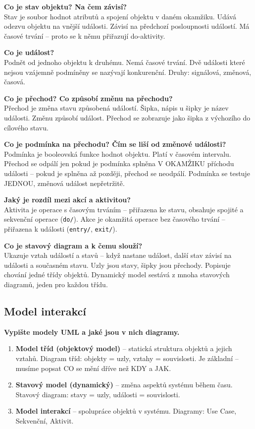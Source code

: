 \documentclass[12pt, a4paper]{article}
\begin{document}
\textbf{Co je stav objektu? Na čem závisí?}\\
Stav je soubor hodnot atributů a spojení objektu v daném okamžiku. Udává odezvu objektu na vnější události. Závisí na předchozí posloupnosti událostí. Má časové trvání -- proto se k němu přiřazují do-aktivity.

\textbf{Co je událost?}\\
Podnět od jednoho objektu k druhému. Nemá časové trvání. Dvě události které nejsou vzájemně podmíněny se nazývají konkurenční. Druhy: signálová, změnová, časová.

\textbf{Co je přechod? Co způsobí změnu na přechodu?}\\
Přechod je změna stavu způsobená událostí. Šipka, nápis u šipky je název události. Změnu způsobí událost. Přechod se zobrazuje jako šipka z výchozího do cílového stavu.

\textbf{Co je podmínka na přechodu? Čím se liší od změnové události?}\\
Podmínka je booleovská funkce hodnot objektu. Platí v časovém intervalu. Přechod se odpálí jen pokud je podmínka splněna V OKAMŽIKU příchodu události -- pokud je splněna až později, přechod se neodpálí. Podmínka se testuje JEDNOU, změnová událost nepřetržitě.

\textbf{Jaký je rozdíl mezi akcí a aktivitou?}\\
Aktivita je operace s časovým trváním -- přiřazena ke stavu, obsahuje spojité a sekvenční operace (\texttt{do/}). Akce je okamžitá operace bez časového trvání -- přiřazena k události (\texttt{entry/}, \texttt{exit/}).

\textbf{Co je stavový diagram a k čemu slouží?}\\
Ukazuje vztah událostí a stavů -- když nastane událost, další stav závisí na události a současném stavu. Uzly jsou stavy, šipky jsou přechody. Popisuje chování jedné třídy objektů. Dynamický model sestává z mnoha stavových diagramů, jeden pro každou třídu.

\subsection{Model interakcí}

\textbf{Vypište modely UML a jaké jsou v nich diagramy.}
\begin{enumerate}
  \item \textbf{Model tříd (objektový model)} -- statická struktura objektů a jejich vztahů. Diagram tříd: objekty = uzly, vztahy = souvislosti. Je základní -- musíme popsat CO se mění dříve než KDY a JAK.
  \item \textbf{Stavový model (dynamický)} -- změna aspektů systému během času. Stavový diagram: stavy = uzly, události = souvislosti.
  \item \textbf{Model interakcí} -- spolupráce objektů v systému. Diagramy: Use Case, Sekvenční, Aktivit.
\end{enumerate}
\end{document}
